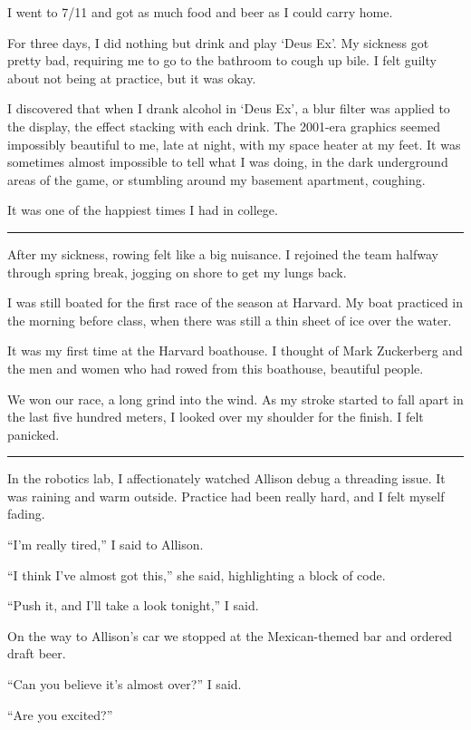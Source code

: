 I went to 7/11 and got as much food and beer as I could carry home.

For three days, I did nothing but drink and play `Deus Ex'.  My sickness got
pretty bad, requiring me to go to the bathroom to cough up bile.  I felt guilty
about not being at practice, but it was okay.

I discovered that when I drank alcohol in `Deus Ex', a blur filter was applied
to the display, the effect stacking with each drink.  The 2001-era graphics
seemed impossibly beautiful to me, late at night, with my space heater at my
feet.  It was sometimes almost impossible to tell what I was doing, in the dark
underground areas of the game, or stumbling around my basement apartment,
coughing.

It was one of the happiest times I had in college.

\plainfancybreak{12pt}{2}{}

After my sickness, rowing felt like a big nuisance.  I rejoined the team halfway
through spring break, jogging on shore to get my lungs back.

I was still boated for the first race of the season at Harvard.  My boat
practiced in the morning before class, when there was still a thin sheet of ice
over the water.

It was my first time at the Harvard boathouse.  I thought of Mark Zuckerberg and
the men and women who had rowed from this boathouse, beautiful people.

We won our race, a long grind into the wind.  As my stroke started to fall apart
in the last five hundred meters, I looked over my shoulder for the finish.  I felt
panicked.

\plainfancybreak{12pt}{2}{}

In the robotics lab, I affectionately watched Allison debug a threading issue.
It was raining and warm outside.  Practice had been really hard, and I felt
myself fading.

``I'm really tired,'' I said to Allison.

``I think I've almost got this,'' she said, highlighting a block of code.

``Push it, and I'll take a look tonight,'' I said.

On the way to Allison's car we stopped at the Mexican-themed bar and ordered
draft beer.

``Can you believe it's almost over?'' I said.

``Are you excited?''

